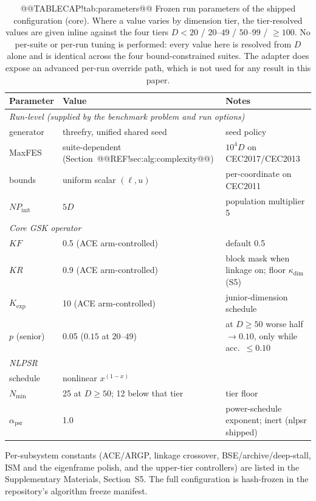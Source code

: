 \documentclass[10pt,a4paper]{article}
\begin{document}
\begin{table}[t]
\caption{@@TABLECAP!tab:parameters@@ Frozen run parameters of the shipped configuration (core).
Where a value varies by dimension tier, the tier-resolved values are given
inline against the four tiers $D{<}20$ / $20$--$49$ / $50$--$99$ / ${\ge}100$.
No per-suite or per-run tuning is performed: every value here is resolved from $D$ alone and is identical across the four bound-constrained suites. The adapter does expose an advanced per-run override path, which is not used for any result in this paper.}
\label{tab:parameters}
\small
\begin{tabular}{lll}
\toprule
\textbf{Parameter} & \textbf{Value} & \textbf{Notes}\\
\midrule
\multicolumn{3}{l}{\emph{Run-level (supplied by the benchmark problem and run options)}}\\
\midrule
generator & threefry, unified shared seed & seed policy\\
MaxFES & suite-dependent (Section~@@REF!sec:alg:complexity@@) & $10^4 D$ on CEC2017/CEC2013\\
bounds & uniform scalar $(\ell,u)$ & per-coordinate on CEC2011\\
$NP_{\text{init}}$ & $5D$ & population multiplier 5\\
\midrule
\multicolumn{3}{l}{\emph{Core GSK operator}}\\
\midrule
$KF$ & 0.5 (ACE arm-controlled) & default 0.5\\
$KR$ & 0.9 (ACE arm-controlled) & block mask when linkage on; floor $\kappa_{\dim}$ (S5)\\
$K_{\exp}$ & 10 (ACE arm-controlled) & junior-dimension schedule\\
$p$ (senior) & 0.05 ($0.15$ at $20$--$49$) & at $D\ge50$ worse half $\to0.10$, only while acc.\ ${\le}0.10$\\
\midrule
\multicolumn{3}{l}{\emph{NLPSR}}\\
\midrule
schedule & nonlinear $x^{(1-x)}$ & \\
$N_{\min}$ & 25 at $D\ge50$; 12 below that tier & tier floor\\
$\alpha_{\text{psr}}$ & 1.0 & power-schedule exponent; inert (nlpsr shipped)\\
\bottomrule
\end{tabular}

\vspace{2pt}
{\footnotesize Per-subsystem constants (ACE/ARGP, linkage crossover,
BSE/archive/deep-stall, ISM and the eigenframe polish, and the upper-tier
controllers) are listed in the Supplementary Materials, Section~S5. The
full configuration is hash-frozen in the repository's algorithm freeze
manifest.}
\end{table}
\end{document}
